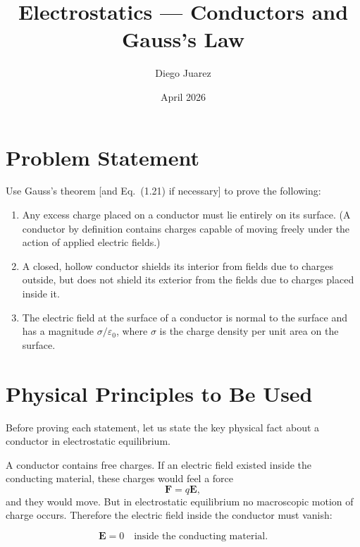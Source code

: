 \documentclass[hidelinks]{article}
\title{\textbf{Electrostatics --- Conductors and Gauss's Law}}
\author{Diego Juarez}
\date{April 2026}
\begin{document}
\hypersetup{bookmarksnumbered=true}
\pagecolor{black}
\color{white}
\maketitle

\begin{Large}
\tableofcontents
\end{Large}
\pagebreak

\section{Problem Statement}

Use Gauss's theorem [and Eq.\ (1.21) if necessary] to prove the following:

\begin{enumerate}[label=\textbf{(\alph*)}]
    \item Any excess charge placed on a conductor must lie entirely on its surface. (A conductor by definition contains charges capable of moving freely under the action of applied electric fields.)

    \item A closed, hollow conductor shields its interior from fields due to charges outside, but does not shield its exterior from the fields due to charges placed inside it.

    \item The electric field at the surface of a conductor is normal to the surface and has a magnitude $\sigma/\varepsilon_0$, where $\sigma$ is the charge density per unit area on the surface.
\end{enumerate}

\section{Physical Principles to Be Used}

Before proving each statement, let us state the key physical fact about a conductor in electrostatic equilibrium.

A conductor contains free charges. If an electric field existed inside the conducting material, these charges would feel a force
\[
\mathbf{F} = q\mathbf{E},
\]
and they would move. But in electrostatic equilibrium no macroscopic motion of charge occurs. Therefore the electric field inside the conductor must vanish:

\[
\boxed{\mathbf{E}=0 \quad \text{inside the conducting material.}}
\]
\end{document}
